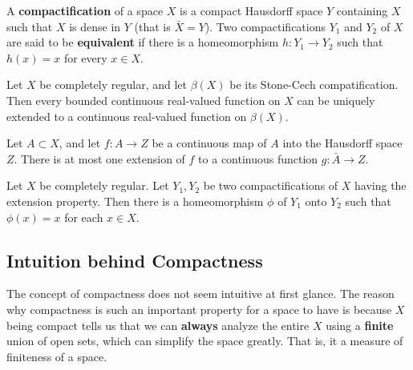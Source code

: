   \begin{definition}
    A \textbf{compactification} of a space $X$ is a compact Hausdorff space $Y$ containing $X$ such that $X$ is dense in $Y$ (that is $\bar{X} = Y$). Two compactifications $Y_1$ and $Y_2$ of $X$ are said to be \textbf{equivalent} if there is a homeomorphism $h: Y_1 \longrightarrow Y_2$ such that $h(x) = x$ for every $x \in X$. 
  \end{definition}

  \begin{theorem}
    Let $X$ be completely regular, and let $\beta(X)$ be its Stone-Cech compatification. Then every bounded continuous real-valued function on $X$ can be uniquely extended to a continuous real-valued function on $\beta(X)$. 
  \end{theorem}

  \begin{lemma}
    Let $A \subset X$, and let $f: A \longrightarrow Z$ be a continuous map of $A$ into the Hausdorff space $Z$. There is at most one extension of $f$ to a continuous function $g: \bar{A} \longrightarrow Z$. 
  \end{lemma}

  \begin{theorem}
    Let $X$ be completely regular. Let $Y_1, Y_2$ be two compactifications of $X$ having the extension property. Then there is a homeomorphism $\phi$ of $Y_1$ onto $Y_2$ such that $\phi(x) = x$ for each $x \in X$. 
  \end{theorem}

\subsection{Intuition behind Compactness}

  The concept of compactness does not seem intuitive at first glance. The reason why compactness is such an important property for a space to have is because $X$ being compact tells us that we can \textbf{always} analyze the entire $X$ using a \textbf{finite} union of open sets, which can simplify the space greatly. That is, it a measure of finiteness of a space. 
  
